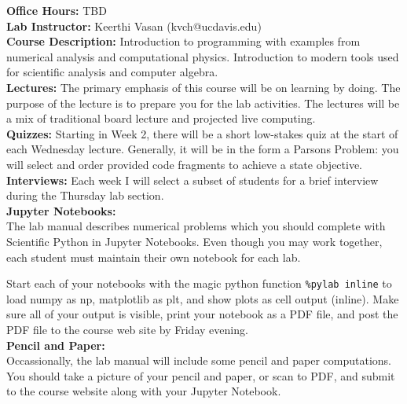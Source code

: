 \documentclass[12pt]{article}
\begin{document}
\noindent
\textbf{Office Hours:} TBD \\

\noindent
\textbf{Lab Instructor:} Keerthi Vasan (kvch@ucdavis.edu) \\

\noindent
\textbf {Course Description:}  
Introduction to programming with examples from numerical analysis and
computational physics. Introduction to modern tools used for
scientific analysis and computer algebra.\\

\noindent
\textbf{Lectures:} The primary emphasis of this course will be on
learning by doing.  The purpose of the lecture is to prepare you for
the lab activities.  The lectures will be a mix of traditional board
lecture and projected live computing.\\

\noindent
\textbf{Quizzes:} Starting in Week 2, there will be a short low-stakes
quiz at the start of each Wednesday lecture.  Generally, it will be in
the form a Parsons Problem: you will select and order provided code
fragments to achieve a state objective.\\

\noindent
\textbf{Interviews:} Each week I will select a subset of students for
a brief interview during the Thursday lab section. \\

\noindent
\textbf {Jupyter Notebooks:}\\ 
The lab manual describes numerical problems which you should complete
with Scientific Python in Jupyter Notebooks.  Even though you may work
together, each student must maintain their own notebook for each lab.

Start each of your notebooks with the magic python function
{\tt\%pylab inline} to load numpy as np, matplotlib as plt, and show
plots as cell output (inline).  Make sure all of your output is
visible, print your notebook as a PDF file, and post the PDF file to
the course web site by Friday evening.\\

\noindent
\textbf {Pencil and Paper:}\\ 
Occassionally, the lab manual will include some pencil and paper computations.  You should take a picture of your pencil and paper, or scan to PDF, and submit to the course website along with your Jupyter Notebook.\\
\end{document}
